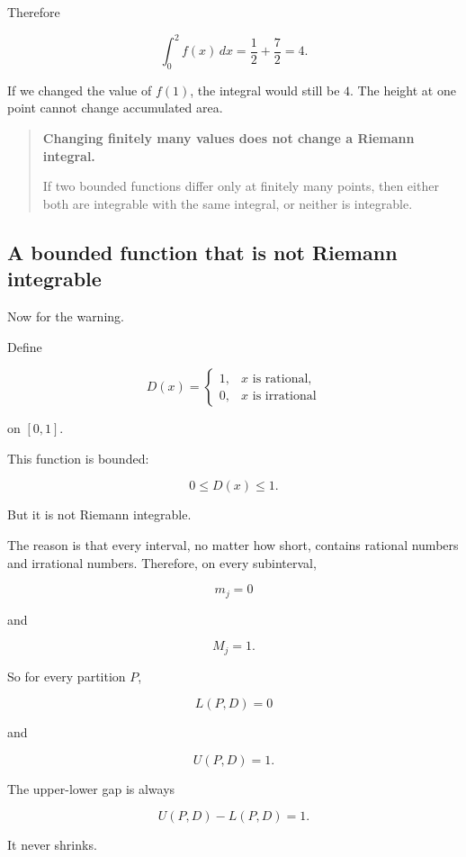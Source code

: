 Therefore

\[
\int_0^2 f(x)\,dx
=
\frac12+\frac72
=
4.
\]

If we changed the value of \(f(1)\), the integral would still be \(4\).  The height at one
point cannot change accumulated area.

\begin{quote}
\textbf{Changing finitely many values does not change a Riemann integral.}

If two bounded functions differ only at finitely many points, then either both are
integrable with the same integral, or neither is integrable.
\end{quote}

\subsection{A bounded function that is not Riemann integrable}
\label{subsec:bounded-not-riemann-integrable}

Now for the warning.

Define

\[
D(x)=
\begin{cases}
1, & x\text{ is rational},\\
0, & x\text{ is irrational}
\end{cases}
\]

on \([0,1]\).

This function is bounded:

\[
0\le D(x)\le1.
\]

But it is not Riemann integrable.

The reason is that every interval, no matter how short, contains rational numbers and
irrational numbers.  Therefore, on every subinterval,

\[
m_j=0
\]

and

\[
M_j=1.
\]

So for every partition \(P\),

\[
L(P,D)=0
\]

and

\[
U(P,D)=1.
\]

The upper-lower gap is always

\[
U(P,D)-L(P,D)=1.
\]

It never shrinks.

